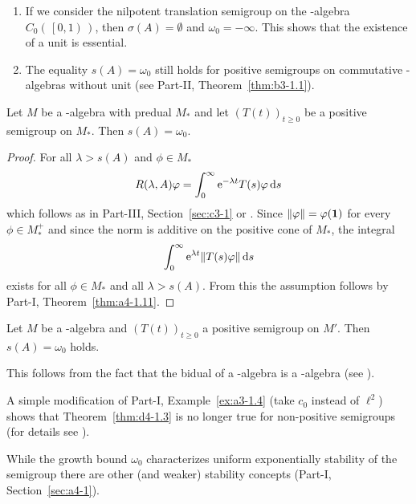 \begin{remark}\label{rem:d4-1.2}
\begin{enumerate}[\upshape (i), wide, labelindent=.25em]
\item
If we consider the nilpotent translation semigroup on the \CA-algebra $C_{0}(\,\left[0,1\right)\,)$, then $\sigma(A) = \emptyset$ and $\omega_{0} = -\infty$.
This shows that the existence of a unit is essential.

\item
The equality $s(A) = \omega_{0}$ still holds for positive semigroups on commutative \CA-algebras without unit 
(see Part-II, Theorem~\ref{thm:b3-1.1}).
\end{enumerate}
\end{remark}
\begin{theorem}\label{thm:d4-1.3}
Let $M$ be a \WA-algebra with predual $M_{*}$ and let $(T(t))_{t \geq 0}$ be a positive semigroup on $M_{*}$.
Then $s(A) = \omega_{0}$.
\end{theorem}
\begin{proof}
For all $\lambda > s(A)$ and $\phi \in M_{*}$
\[
R(\lambda,A)\phi = \int_{0}^{\infty} \eu^{-\lambda t}T(s)\phi \ds
\]
which follows as in Part-III, Section~\ref{sec:c3-1} or \textcite[Theorem 3]{greinervoigtwolff:1981}.
Since $\|\phi\| = \phi(\1)$ for every $\phi \in M_{*}^{+}$ and since the norm is additive on the positive cone of\/ $M_{*}$, the integral
\[
	\int_{0}^{\infty} \eu^{\lambda t}\|T(s)\phi\| \ds
\]
exists for all $\phi \in M_{*}$ and all $\lambda > s(A)$.
From this the assumption follows by Part-I, Theorem~\ref{thm:a4-1.11}.
\end{proof}
\begin{corollary}\label{cor:d4-1.4}
Let $M$ be a \CA-algebra and $(T(t))_{t \geq 0}$ a positive semigroup on $M'$.
Then $s(A) = \omega_{0}$ holds.
\end{corollary}
\noindent This follows from the fact that the bidual of a \CA-algebra is a \WA-algebra (see \textcite[Theorem III.2.4.]{takesaki:1979}).
\begin{remark}\label{rem:d4-1.5}
A simple modification of Part-I, Example~\ref{ex:a3-1.4} (take $c_{0}$ instead of\/ $\ell^2$) shows that Theorem~\ref{thm:d4-1.3} is no longer true for non-positive semigroups (for details see \textcite[Beispiel 2.5]{grohneubrander:1981}).

While the growth bound $\omega_{0}$ characterizes uniform exponentially stability of the semigroup there are other (and weaker) stability concepts (\cf Part-I, Section~\ref{sec:a4-1}).
\end{remark}
